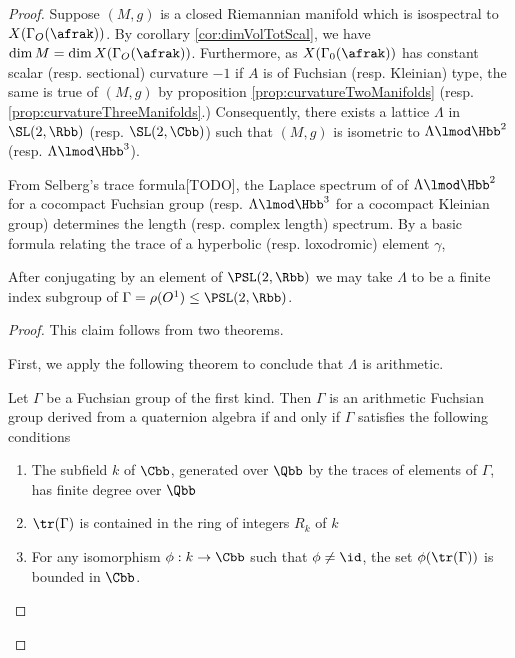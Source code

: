 \begin{proof}
  Suppose $(M,g)$ is a closed Riemannian manifold which is isospectral to $X(\Gamma_O(\afrak))$. By corollary \ref{cor:dimVolTotScal}, we have $\dim M = \dim X(\Gamma_O(\afrak))$. Furthermore, as  $X(\Gamma_0(\afrak))$ has constant scalar (resp. sectional) curvature $-1$ if $A$ is of Fuchsian (resp. Kleinian) type, the same is true of $(M,g)$ by proposition \ref{prop:curvatureTwoManifolds} (resp. \ref{prop:curvatureThreeManifolds}.) Consequently, there exists a lattice $\Lambda$ in $\SL(2,\Rbb)$ (resp. $\SL(2,\Cbb)$) such that $(M,g)$ is isometric to $\Lambda \lmod \Hbb^2$ (resp. $\Lambda\lmod \Hbb^3$).

  From Selberg's trace formula[TODO], the Laplace spectrum of  of $\Lambda \lmod \Hbb^2$ for a cocompact Fuchsian group (resp. $\Lambda \lmod \Hbb^3$ for a cocompact Kleinian group) determines the length (resp. complex length) spectrum.  By a basic formula relating the trace of a hyperbolic (resp. loxodromic) element $\gamma$,




  \begin{claim}
    After conjugating by an element of $\PSL(2,\Rbb)$ we may take $\Lambda$ to be a finite index subgroup of $\Gamma = \rho(O^1) \leq  \PSL(2,\Rbb)$.
  \end{claim}
  \begin{proof}
    This claim follows from two theorems.

    First, we apply the following theorem to conclude that $\Lambda$ is arithmetic.
    \begin{thm}\label{thm:takeuchi}
      Let $\Gamma$ be a Fuchsian group of the first kind. Then $\Gamma$ is an arithmetic Fuchsian group derived from a quaternion algebra if and only if $\Gamma$ satisfies the following conditions
      \begin{enumerate}
        \item The subfield $k$ of $\Cbb$, generated over $\Qbb$ by the traces of elements of $\Gamma$, has finite degree over $\Qbb$
        \item $\tr(\Gamma)$ is contained in the ring of integers $R_{k}$ of $k$
        \item For any isomorphism $\phi: k \to \Cbb$ such that $\phi \neq \id$, the set $\phi(\tr(\Gamma))$ is bounded in $\Cbb$.
      \end{enumerate}
    \end{thm}


\end{proof}
\end{proof}
